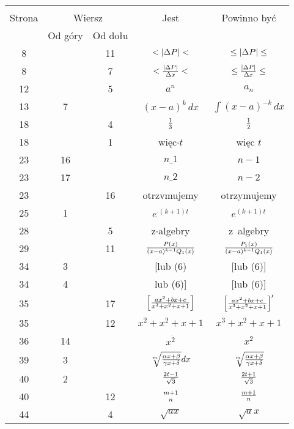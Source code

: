 \documentclass[a4paper,11pt]{article}
\begin{document}
\begin{center}
  \begin{tabular}{|c|c|c|c|c|}
    \hline
    & \multicolumn{2}{c|}{} & & \\
    Strona & \multicolumn{2}{c|}{Wiersz} & Jest
                              & Powinno być \\ \cline{2-3}
    & Od góry & Od dołu & & \\
    \hline
    8   & & 11 & $< | \Delta P | <$ & $\leq | \Delta P | \leq$ \\
    8   & &  7 & $< \frac{ | \Delta P | }{ \Delta x } <$
           & $\leq \frac{ | \Delta P | }{ \Delta x } \leq$ \\
    12  & &  5 & $a^{ n }$ & $a_{ n }$ \\
    13  &  7 & & $( x - a )^{ k }\, dx$ & $\int ( x - a )^{ -k }\, dx$ \\
    18  & &  4 & $\frac{ 1 }{ 3 }$ & $\frac{ 1 }{ 2 }$ \\
    18  & &  1 & więc$\cdot t$ & więc $t$ \\
    23  & 16 & & $n \_ 1$ & $n - 1$ \\
    23  & 17 & & $n \_ 2$ & $n - 2$ \\
    23  & & 16 & otrzvmujemy & otrzymujemy \\
    25  &  1 & & $e^{ \cdot (k + 1) t}$ & $e^{ (k + 1) t}$ \\
    28  & &  5 & z$\cdot$algebry & z~algebry \\
    29  & & 11 & $\frac{ P(x) }{ (x - a)^{k - 1} Q_{ 1 }(x) }$
           & $\frac{ P_{ 1 }(x) }{ (x - a)^{k - 1} Q_{ 1 }(x) }$ \\
    34  &  3 & & [lub (6) & [lub (6)] \\
    34  &  4 & & lub (6)] & [lub (6)] \\
    35  & & 17 & $\left[ \frac{ a x^{ 2 } + b x + c }
                 { x^{ 3 } + x^{ 2 } + x + 1 } \right]$
           & $\left[ \frac{ a x^{ 2 } + b x + c }
             { x^{ 3 } + x^{ 2 } + x + 1 } \right]'$ \\
    35  & & 12 & $x^{ 2 } + x^{ 2 } + x + 1$
           & $x^{ 3 } + x^{ 2 } + x + 1$ \\
    36  & 14 & & $x^{ \dot{ 2 } }$ & $x^{ 2 }$ \\
    39  &  3 & & $\sqrt[ m ]{ \frac{ \alpha x + \beta }{ \gamma x + \delta } } dx$
           & $\sqrt[ m ]{ \frac{ \alpha x + \beta }{ \gamma x + \delta } }$ \\
    40  &  2 & & $\frac{ 2t - 1 }{ \sqrt{ 3 } }$
           & $\frac{ 2t + 1 }{ \sqrt{ 3 } }$ \\
    40  & & 12 & ${ m + 1 \atop n }$ & $\frac{ m + 1 }{ n }$ \\
    44  & &  4 & $\sqrt{ ax }$ & $\sqrt{ a } x$ \\ \hline
  \end{tabular}


\end{center}
\end{document}
